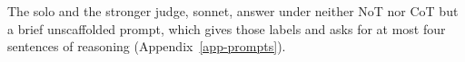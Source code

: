 The solo and the stronger judge, sonnet, answer under neither NoT nor CoT
but a brief unscaffolded prompt, which gives those labels and asks for at
most four sentences of reasoning (Appendix~\ref{app-prompts}).
